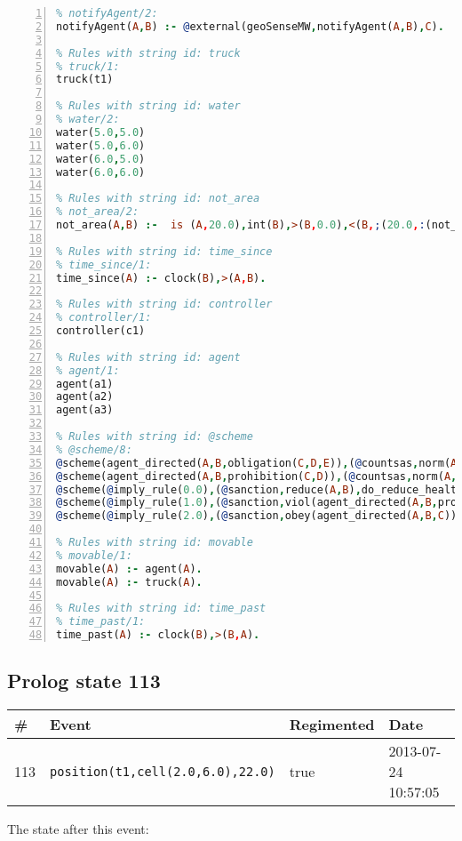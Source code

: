 \documentclass[11pt]{article}\usepackage[utf8]{inputenc}\usepackage{geometry}
\begin{document}
\begin{lstlisting}[language=Prolog, numbers=left]
% Rules with string id: notifyAgent
% notifyAgent/2:
notifyAgent(A,B) :- @external(geoSenseMW,notifyAgent(A,B),C).

% Rules with string id: truck
% truck/1:
truck(t1)

% Rules with string id: water
% water/2:
water(5.0,5.0)
water(5.0,6.0)
water(6.0,5.0)
water(6.0,6.0)

% Rules with string id: not_area
% not_area/2:
not_area(A,B) :-  is (A,20.0),int(B),>(B,0.0),<(B,;(20.0,:(not_area(A,B), is (-(B),20.0)))),int(A),>(A,0.0),<(A,;(20.0,:(area(A,B),-(int(A))))),int(B),>(A,0.0),>(B,0.0),<(A,21.0),<(B,21.0).

% Rules with string id: time_since
% time_since/1:
time_since(A) :- clock(B),>(A,B).

% Rules with string id: controller
% controller/1:
controller(c1)

% Rules with string id: agent
% agent/1:
agent(a1)
agent(a2)
agent(a3)

% Rules with string id: @scheme
% @scheme/8:
@scheme(agent_directed(A,B,obligation(C,D,E)),(@countsas,norm(A,B,F,obligation(C,D,E)),F),false,(listTrue(C)),(time_past(D)),false,[plus(viol(agent_directed(A,B,obligation(C,D,E))))|[]],[plus(obey(agent_directed(A,B,obligation(C,D,E))))|[]])
@scheme(agent_directed(A,B,prohibition(C,D)),(@countsas,norm(A,B,E,prohibition(C,D)),E),(listTrue(C)),false,(false),false,[plus(viol(agent_directed(A,B,prohibition(C,D))))|[]],[plus(obey(agent_directed(A,B,prohibition(C,D))))|[]])
@scheme(@imply_rule(0.0),(@sanction,reduce(A,B),do_reduce_health(A,B),notifyAgent(A,changed(status))),true,false,false,false,[min(reduce(A,B))|[]],[])
@scheme(@imply_rule(1.0),(@sanction,viol(agent_directed(A,B,prohibition(C,D))),do_sanction(D)),true,false,false,false,[min(viol(agent_directed(A,B,prohibition(C,D))))|[]],[])
@scheme(@imply_rule(2.0),(@sanction,obey(agent_directed(A,B,C))),true,false,false,false,[min(obey(agent_directed(A,B,C)))|[]],[])

% Rules with string id: movable
% movable/1:
movable(A) :- agent(A).
movable(A) :- truck(A).

% Rules with string id: time_past
% time_past/1:
time_past(A) :- clock(B),>(B,A).

\end{lstlisting}
\clearpage 
\subsection{Prolog state 113}
\begin{table}[ht]
\centering 
\begin{tabular}{l l l l} 
\textbf{\#} & \textbf{Event} & \textbf{Regimented} & \textbf{Date} \\ [0.5ex] 
\hline
113&\texttt{position(t1,cell(2.0,6.0),22.0)}&true&2013-07-24 10:57:05\\ [1ex] \hline\end{tabular}
\end{table}
The state after this event:
\end{document}
